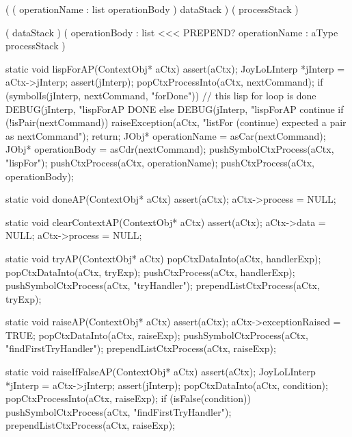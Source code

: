 \starttyping

\startWord[lispInterpret]

\preDataStack
  (
    (
      operationName : list
      operationBody
    )
    dataStack 
  )
\preProcessStack
  (
    processStack
  )
\preConditions
\stopPreStack

\postDataStack
  ( dataStack )
\postProcessStack
  (
    operationBody : list <<< PREPEND?
    operationName : aType
    processStack
  )
\postConditions
\stopPostStack

\stopWord

\stoptyping

\startCCode
static void lispForAP(ContextObj* aCtx) {
  assert(aCtx);
  JoyLoLInterp *jInterp = aCtx->jInterp;
  assert(jInterp);
  popCtxProcessInto(aCtx, nextCommand);
  if (symbolIs(jInterp, nextCommand, "forDone")) {
    // this lisp for loop is done
    DEBUG(jInterp, "lispForAP DONE%
  } else {
    DEBUG(jInterp, "lispForAP continue%
    if (!isPair(nextCommand)) {
      raiseException(aCtx,
        "listFor (continue) expected a pair as nextCommand");
      return;
    }
    JObj* operationName = asCar(nextCommand);
    JObj* operationBody = asCdr(nextCommand);
    pushSymbolCtxProcess(aCtx, "lispFor");
    pushCtxProcess(aCtx, operationName);
    pushCtxProcess(aCtx, operationBody);
  }
}
\stopCCode

\startCCode
static void doneAP(ContextObj* aCtx) {
  assert(aCtx);
  aCtx->process = NULL;
}
\stopCCode

\startCCode
static void clearContextAP(ContextObj* aCtx) {
  assert(aCtx);
  aCtx->data    = NULL;
  aCtx->process = NULL;
}
\stopCCode

\startCCode
static void tryAP(ContextObj* aCtx) {
  popCtxDataInto(aCtx, handlerExp);
  popCtxDataInto(aCtx, tryExp);
  pushCtxProcess(aCtx, handlerExp);
  pushSymbolCtxProcess(aCtx, "tryHandler");
  prependListCtxProcess(aCtx, tryExp);
}
\stopCCode

\startCCode
static void raiseAP(ContextObj* aCtx) {
  assert(aCtx);
  aCtx->exceptionRaised = TRUE;
  popCtxDataInto(aCtx, raiseExp);
  pushSymbolCtxProcess(aCtx, "findFirstTryHandler");
  prependListCtxProcess(aCtx, raiseExp);
}
\stopCCode

\startCCode
static void raiseIfFalseAP(ContextObj* aCtx) {
  assert(aCtx);
  JoyLoLInterp *jInterp = aCtx->jInterp;
  assert(jInterp);
  popCtxDataInto(aCtx, condition);
  popCtxProcessInto(aCtx, raiseExp);
  if (isFalse(condition)) {
    pushSymbolCtxProcess(aCtx, "findFirstTryHandler");
    prependListCtxProcess(aCtx, raiseExp);
  }
}
\stopCCode

